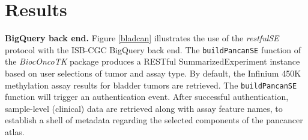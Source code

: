 \documentclass[applications]{gen-bioinformatics}
\newcommand{\Biocpackage}[1]{{\textit{#1}}}
\newcommand{\BiocpackageFirst}[1]{{\textit{#1}}}
\newcommand{\CRANpackageFirst}[1]{{\emph{\href{https://cran.r-project.org/web/packages/#1/index.html}{#1}}}}
\begin{document}

\section*{Results}


\textbf{BigQuery back end.} Figure \ref{bladcan} illustrates the 
use of the \Biocpackage{restfulSE} protocol
with the ISB-CGC BigQuery back end.  
The \texttt{buildPancanSE} function
of the \BiocpackageFirst{BiocOncoTK} package produces
a RESTful SummarizedExperiment instance based on
user selections of tumor and assay type.  By default,
the Infinium 450K methylation assay results for bladder tumors
are retrieved.  The \texttt{buildPancanSE} function
will trigger an authentication event.  After successful
authentication, sample-level (clinical) data are retrieved
along with assay feature names, to establish a shell
of metadata regarding the selected components of the
pancancer atlas.


\end{document}
